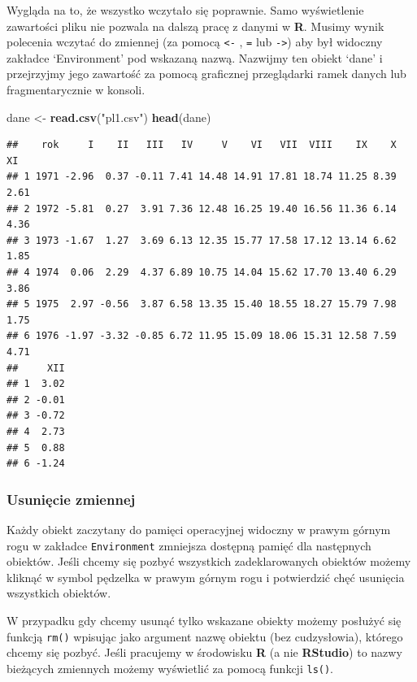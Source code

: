 \documentclass[]{book}
\newenvironment{Shaded}{\begin{snugshade}}{\end{snugshade}}
\newcommand{\KeywordTok}[1]{\textcolor[rgb]{0.13,0.29,0.53}{\textbf{#1}}}
\newcommand{\StringTok}[1]{\textcolor[rgb]{0.31,0.60,0.02}{#1}}
\newcommand{\NormalTok}[1]{#1}
\theoremstyle{definition}
\theoremstyle{definition}
\theoremstyle{definition}
\theoremstyle{remark}
\begin{document}
Wygląda na to, że wszystko wczytało się poprawnie. Samo wyświetlenie
zawartości pliku nie pozwala na dalszą pracę z danymi w \textbf{R}.
Musimy wynik polecenia wczytać do zmiennej (za pomocą
\texttt{\textless{}-} , \texttt{=} lub \texttt{-\textgreater{}}) aby był
widoczny zakładce `Environment' pod wskazaną nazwą. Nazwijmy ten obiekt
`dane' i przejrzyjmy jego zawartość za pomocą graficznej przeglądarki
ramek danych lub fragmentarycznie w konsoli.

\begin{Shaded}
\begin{Highlighting}[]
\NormalTok{dane <-}\StringTok{ }\KeywordTok{read.csv}\NormalTok{(}\StringTok{"pl1.csv"}\NormalTok{)}
\KeywordTok{head}\NormalTok{(dane)}
\end{Highlighting}
\end{Shaded}

\begin{verbatim}
##    rok     I    II   III   IV     V    VI   VII  VIII    IX    X   XI
## 1 1971 -2.96  0.37 -0.11 7.41 14.48 14.91 17.81 18.74 11.25 8.39 2.61
## 2 1972 -5.81  0.27  3.91 7.36 12.48 16.25 19.40 16.56 11.36 6.14 4.36
## 3 1973 -1.67  1.27  3.69 6.13 12.35 15.77 17.58 17.12 13.14 6.62 1.85
## 4 1974  0.06  2.29  4.37 6.89 10.75 14.04 15.62 17.70 13.40 6.29 3.86
## 5 1975  2.97 -0.56  3.87 6.58 13.35 15.40 18.55 18.27 15.79 7.98 1.75
## 6 1976 -1.97 -3.32 -0.85 6.72 11.95 15.09 18.06 15.31 12.58 7.59 4.71
##     XII
## 1  3.02
## 2 -0.01
## 3 -0.72
## 4  2.73
## 5  0.88
## 6 -1.24
\end{verbatim}

\subsubsection*{Usunięcie zmiennej}\label{usuniecie-zmiennej}

Każdy obiekt zaczytany do pamięci operacyjnej widoczny w prawym górnym
rogu w zakładce \texttt{Environment} zmniejsza dostępną pamięć dla
następnych obiektów. Jeśli chcemy się pozbyć wszystkich zadeklarowanych
obiektów możemy kliknąć w symbol pędzelka w prawym górnym rogu i
potwierdzić chęć usunięcia wszystkich obiektów.

W przypadku gdy chcemy usunąć tylko wskazane obiekty możemy posłużyć się
funkcją \texttt{rm()} wpisując jako argument nazwę obiektu (bez
cudzysłowia), którego chcemy się pozbyć. Jeśli pracujemy w środowisku
\textbf{R} (a nie \textbf{RStudio}) to nazwy bieżących zmiennych możemy
wyświetlić za pomocą funkcji \texttt{ls()}.
\end{document}
